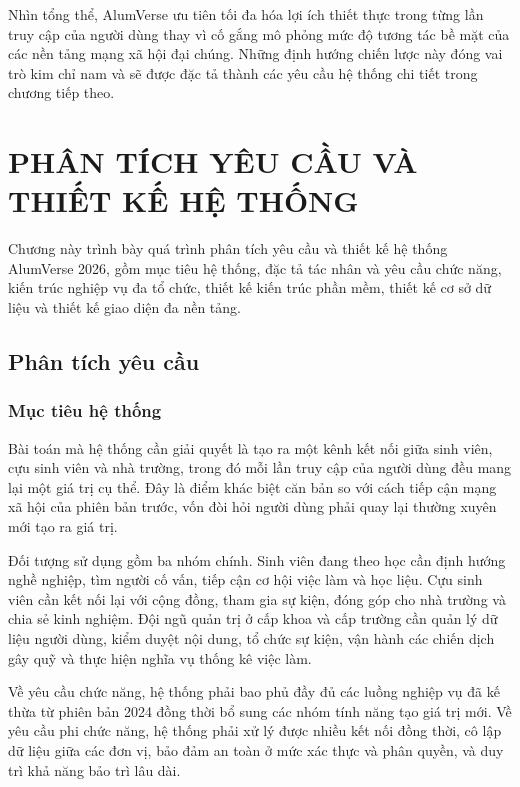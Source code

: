 \documentclass[12pt,a4paper,oneside]{report}
\begin{document}
Nhìn tổng thể, AlumVerse ưu tiên tối đa hóa lợi ích thiết thực trong từng lần truy cập của người dùng thay vì cố gắng mô phỏng mức độ tương tác bề mặt của các nền tảng mạng xã hội đại chúng. Những định hướng chiến lược này đóng vai trò kim chỉ nam và sẽ được đặc tả thành các yêu cầu hệ thống chi tiết trong chương tiếp theo.

\chapter{PHÂN TÍCH YÊU CẦU VÀ THIẾT KẾ HỆ THỐNG}

Chương này trình bày quá trình phân tích yêu cầu và thiết kế hệ thống AlumVerse 2026, gồm mục tiêu hệ thống, đặc tả tác nhân và yêu cầu chức năng, kiến trúc nghiệp vụ đa tổ chức, thiết kế kiến trúc phần mềm, thiết kế cơ sở dữ liệu và thiết kế giao diện đa nền tảng.

\section{Phân tích yêu cầu}

\subsection{Mục tiêu hệ thống}

Bài toán mà hệ thống cần giải quyết là tạo ra một kênh kết nối giữa sinh viên, cựu sinh viên và nhà trường, trong đó mỗi lần truy cập của người dùng đều mang lại một giá trị cụ thể. Đây là điểm khác biệt căn bản so với cách tiếp cận mạng xã hội của phiên bản trước, vốn đòi hỏi người dùng phải quay lại thường xuyên mới tạo ra giá trị.

Đối tượng sử dụng gồm ba nhóm chính. Sinh viên đang theo học cần định hướng nghề nghiệp, tìm người cố vấn, tiếp cận cơ hội việc làm và học liệu. Cựu sinh viên cần kết nối lại với cộng đồng, tham gia sự kiện, đóng góp cho nhà trường và chia sẻ kinh nghiệm. Đội ngũ quản trị ở cấp khoa và cấp trường cần quản lý dữ liệu người dùng, kiểm duyệt nội dung, tổ chức sự kiện, vận hành các chiến dịch gây quỹ và thực hiện nghĩa vụ thống kê việc làm.

Về yêu cầu chức năng, hệ thống phải bao phủ đầy đủ các luồng nghiệp vụ đã kế thừa từ phiên bản 2024 đồng thời bổ sung các nhóm tính năng tạo giá trị mới. Về yêu cầu phi chức năng, hệ thống phải xử lý được nhiều kết nối đồng thời, cô lập dữ liệu giữa các đơn vị, bảo đảm an toàn ở mức xác thực và phân quyền, và duy trì khả năng bảo trì lâu dài.
\end{document}
